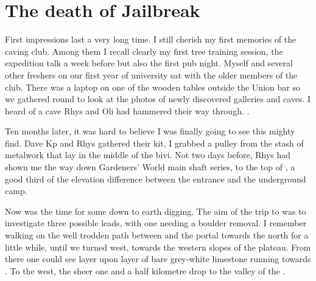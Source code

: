 \section{The death of Jailbreak}
	\begin{marginfigure}
	\end{marginfigure}

	First impressions last a very long time. I still cherish my first memories of the caving club. Among them I recall clearly my first tree training session, the expedition talk a week before but also the first pub night. Myself and several other freshers on our first year of university sat with the older members of the club. There was a laptop on one of the wooden tables outside the Union bar so we gathered round to look at the photos of newly discovered galleries and caves. I heard of a cave Rhys and Oli had hammered their way through. .

	Ten months later, it was hard to believe I was finally going to see this mighty find. Dave Kp and Rhys gathered their kit, I grabbed a pulley from the stash of metalwork that lay in the middle of the bivi. Not two days before, Rhys had shown me the way down Gardeners' World main shaft series, to the top of , a good third of the elevation difference between the entrance and the underground camp.

	Now was the time for some down to earth digging. The aim of the trip to  was to investigate three possible leads, with one needing a boulder removal. I remember walking on the well trodden path between  and the portal towards the north for a little while, until we turned west, towards the western slopes of the plateau. From there one could see layer upon layer of bare grey-white limestone running towards . To the west, the sheer one and a half kilometre drop to the valley of the .

